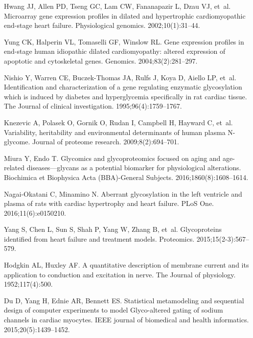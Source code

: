 \documentclass[10pt,letterpaper]{article}
\begin{document}
\begin{thebibliography}{10}
    Hwang JJ, Allen PD, Tseng GC, Lam CW, Fananapazir L, Dzau VJ, et~al.
    \newblock Microarray gene expression profiles in dilated and hypertrophic
    cardiomyopathic end-stage heart failure.
    \newblock Physiological genomics. 2002;10(1):31--44.
    
    Yung CK, Halperin VL, Tomaselli GF, Winslow RL.
    \newblock Gene expression profiles in end-stage human idiopathic dilated
    cardiomyopathy: altered expression of apoptotic and cytoskeletal genes.
    \newblock Genomics. 2004;83(2):281--297.
    
    Nishio Y, Warren CE, Buczek-Thomas JA, Rulfs J, Koya D, Aiello LP, et~al.
    \newblock Identification and characterization of a gene regulating enzymatic
    glycosylation which is induced by diabetes and hyperglycemia specifically in
    rat cardiac tissue.
    \newblock The Journal of clinical investigation. 1995;96(4):1759--1767.
    
    Knezevic A, Polasek O, Gornik O, Rudan I, Campbell H, Hayward C, et~al.
    \newblock Variability, heritability and environmental determinants of human
    plasma N-glycome.
    \newblock Journal of proteome research. 2009;8(2):694--701.
    
    Miura Y, Endo T.
    \newblock Glycomics and glycoproteomics focused on aging and age-related
    diseases—glycans as a potential biomarker for physiological alterations.
    \newblock Biochimica et Biophysica Acta (BBA)-General Subjects.
    2016;1860(8):1608--1614.
    
    Nagai-Okatani C, Minamino N.
    \newblock Aberrant glycosylation in the left ventricle and plasma of rats with
    cardiac hypertrophy and heart failure.
    \newblock PLoS One. 2016;11(6):e0150210.
    
    Yang S, Chen L, Sun S, Shah P, Yang W, Zhang B, et~al.
    \newblock Glycoproteins identified from heart failure and treatment models.
    \newblock Proteomics. 2015;15(2-3):567--579.
    
    Hodgkin AL, Huxley AF.
    \newblock A quantitative description of membrane current and its application to
    conduction and excitation in nerve.
    \newblock The Journal of physiology. 1952;117(4):500.
    
    Du D, Yang H, Ednie AR, Bennett ES.
    \newblock Statistical metamodeling and sequential design of computer
    experiments to model Glyco-altered gating of sodium channels in cardiac
    myocytes.
    \newblock IEEE journal of biomedical and health informatics.
    2015;20(5):1439--1452.
    

\end{thebibliography}
\end{document}
